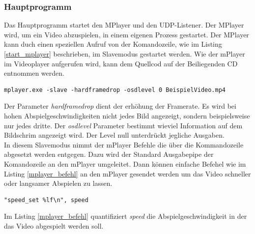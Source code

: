 \subsubsection{Hauptprogramm}
Das Hauptprogramm startet den MPlayer und den UDP-Listener. Der MPlayer wird, um ein Video abzuspielen, in einem eigenen Prozess gestartet. Der MPlayer kann duch einen speziellen Aufruf von der Komandozeile, wie im Listing \ref{start_mplayer} beschrieben, im Slavemodus gestartet werden. Wie der mPlayer im Videoplayer aufgerufen wird, kann dem Quellcod auf der Beiliegenden CD entnommen werden. 
\begin{lstlisting}[caption={Starten des MPlayers in einem eigenen Prozess}, label={start_mplayer}]
mplayer.exe -slave -hardframedrop -osdlevel 0 BeispielVideo.mp4
\end{lstlisting}
Der Parameter \textit{hardframedrop} dient der erhöhung der Framerate. Es wird bei hohen Abspielgeschwindigkeiten nicht jedes Bild angezeigt, sondern beispielsweise nur jedes dritte. Der \textit{osdlevel} Parameter bestimmt wieviel Information auf dem Bildschrim angezeigt wird. Der Level null unterdrückt jegliche Ausgaben.\\
In diesem Slavemodus nimmt der mPlayer Befehle die über die Kommandozeile abgesetzt werden entgegen. Dazu wird der Standard Ausgabepipe der Komandozeile an den mPlayer umgeleitet. Dann können einfache Befehel wie im Listing \ref{mplayer_befehl} an den mPlayer gesendet werden um das Video schneller oder langsamer Abspielen zu lassen. 
\begin{lstlisting}[caption={Befehl an den mPlayer über den Stardard Ausgabe Pipe}, label={mplayer_befehl}]
"speed_set %lf\n", speed
\end{lstlisting}
Im Listing \ref{mplayer_befehl} quantifiziert \textit{speed} die Abspielgeschwindigkeit in der das Video abgespielt werden soll. 